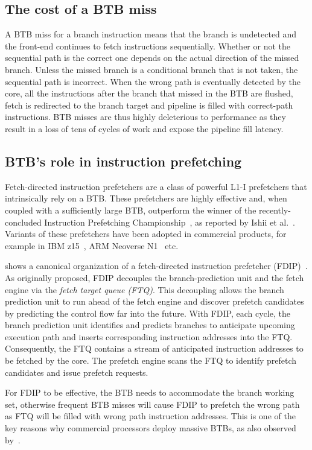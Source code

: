 \subsection{The cost of a BTB miss}
A BTB miss for a branch instruction means that the branch is undetected and the front-end continues to fetch instructions sequentially. Whether or not the sequential path is the correct one depends on the actual direction of the missed branch. Unless the missed branch is a conditional branch that is not taken, the sequential path is incorrect. When the wrong path is eventually detected by the core, all the instructions after the branch that missed in the BTB are flushed, fetch is redirected to the branch target and pipeline is filled with correct-path instructions. BTB misses are thus highly deleterious to performance as they result in a loss of tens of cycles of work and expose the pipeline fill latency. 


\subsection{BTB's role in instruction prefetching}
Fetch-directed instruction prefetchers are a class of powerful L1-I prefetchers that intrinsically rely on a BTB. 
These prefetchers are highly effective and, when coupled with a sufficiently large BTB, outperform the winner of the recently-concluded Instruction Prefetching Championship~\cite{ipc1}, as reported by Ishii et al.~\cite{rebase}. Variants of these prefetchers have been adopted in commercial products, for example in IBM z15~\cite{IBMz15HotChips}, ARM Neoverse N1~\cite{neoverse} etc.

 shows a canonical organization of a fetch-directed instruction prefetcher (FDIP)~\cite{fdip}. 
As originally proposed, FDIP decouples the branch-prediction unit and the fetch engine via the {\em fetch target queue (FTQ)}. This decoupling allows the branch prediction unit to run ahead of the fetch engine and discover prefetch candidates by predicting the control flow far into the future. With FDIP, each cycle, the branch prediction unit identifies and predicts branches to anticipate upcoming execution path and inserts corresponding instruction addresses into the FTQ. Consequently, the FTQ contains a stream of anticipated instruction addresses to be fetched by the core. The prefetch engine scans the FTQ to identify prefetch candidates and issue prefetch requests.

For FDIP to be effective, the BTB needs to accommodate the branch working set, otherwise frequent BTB misses will cause FDIP to prefetch the wrong path as FTQ will be filled with wrong path instruction addresses. This is one of the key reasons why commercial processors deploy massive BTBs, as also observed by~\cite{rebase}.


